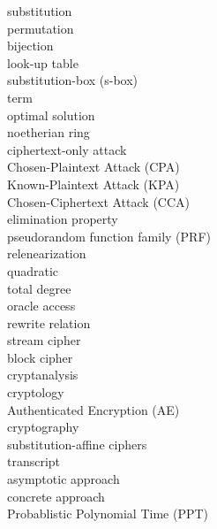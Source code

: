 \begin{latin}
substitution\dotfill {}\\
permutation\dotfill {}\\
bijection\dotfill {}\\
look-up table\dotfill {}\\
substitution-box (s-box)\dotfill {}\\
term\dotfill {}\\
optimal solution\dotfill {}\\
noetherian ring\dotfill {}\\
ciphertext-only attack\dotfill {}\\
Chosen-Plaintext Attack (CPA)\dotfill {}\\
Known-Plaintext Attack (KPA)\dotfill {}\\
Chosen-Ciphertext Attack (CCA)\dotfill {}\\
elimination property\dotfill {}\\
pseudorandom function family (PRF)\dotfill {}\\
relenearization\dotfill {}\\
quadratic \dotfill {}\\
total degree\dotfill {}\\
oracle access\dotfill {}\\
rewrite relation\dotfill {}\\
stream cipher\dotfill {}\\
block cipher\dotfill {}\\
cryptanalysis\dotfill {}\\
cryptology\dotfill {}\\
Authenticated Encryption (AE)\dotfill {}\\
cryptography\dotfill {}\\
substitution-affine ciphers\dotfill {}\\
transcript\dotfill {}\\
asymptotic approach\dotfill {}\\
concrete approach\dotfill {}\\
Probablistic Polynomial Time (PPT)\dotfill {}\\

\end{latin}

